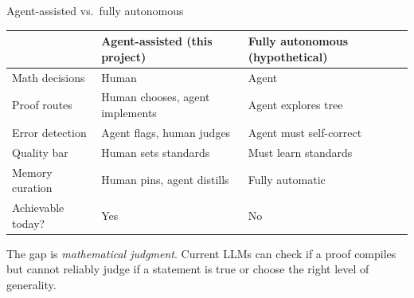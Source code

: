 \documentclass[aspectratio=169,10pt]{beamer}
\begin{document}
\begin{frame}{Agent-assisted vs.\ fully autonomous}
    \vspace{-0.4em}
    \begin{center}
    \renewcommand{\arraystretch}{1.25}
    {\footnotesize
    \begin{tabular}{@{}p{3.2cm} p{4.2cm} p{4.5cm}@{}}
        \toprule
        & \textbf{Agent-assisted} {\scriptsize(this project)} & \textbf{Fully autonomous} {\scriptsize(hypothetical)} \\
        \midrule
        Math decisions & Human & Agent \\
        Proof routes & Human chooses, agent implements & Agent explores tree \\
        Error detection & Agent flags, human judges & Agent must self-correct \\
        Quality bar & Human sets standards & Must learn standards \\
        Memory curation & Human pins, agent distills & Fully automatic \\
        \midrule
        Achievable today? & \textcolor{leangreen}{Yes} & \textcolor{softred}{No}\\
        \bottomrule
    \end{tabular}
    }
    \end{center}
    \vspace{0.4em}
    \textcolor{dimwhite}{\footnotesize The gap is \emph{mathematical judgment}. Current LLMs can check if a proof compiles but cannot reliably judge if a statement is true or choose the right level of generality.}
\end{frame}
\end{document}
